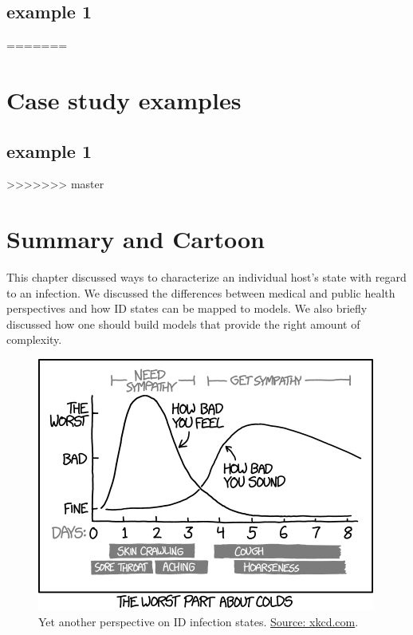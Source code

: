 \documentclass[]{book}
\theoremstyle{definition}
\theoremstyle{definition}
\theoremstyle{definition}
\theoremstyle{remark}
\begin{document}
\hypertarget{example-1}{%
\subsection{example 1}\label{example-1}}
=======
\section{Case study examples}\label{case-study-examples}

\subsection{example 1}\label{example-1}
>>>>>>> master

\hypertarget{summary-and-cartoon}{%
\section{Summary and Cartoon}\label{summary-and-cartoon}}

This chapter discussed ways to characterize an individual host's state
with regard to an infection. We discussed the differences between
medical and public health perspectives and how ID states can be mapped
to models. We also briefly discussed how one should build models that
provide the right amount of complexity.

\begin{figure}
\centering
\includegraphics{./images/xkcd-course-of-colds.png}
\caption{\label{fig:coldcourse}Yet another perspective on ID infection
states. \href{https://xkcd.com/1612/}{Source: xkcd.com}.}
\end{figure}
\end{document}
